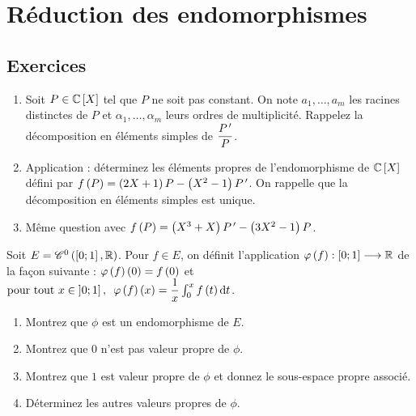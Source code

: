 \chapter{Réduction des endomorphismes}

\minitoc

\section*{Exercices}

\legendeexercices

\begin{exoss}[Exercice 1]
\begin{enumerate}
    \item Soit \(P\in\poly[\C]\) tel que \(P\) ne soit pas constant. On note \(a_1,\dots,a_m\) les racines distinctes de \(P\) et \(\alpha_1,\dots,\alpha_m\) leurs ordres de multiplicité. Rappelez la décomposition en éléments simples de \(\dfrac{P^{\,\prime}}{P}\). \\
    \item Application : déterminez les éléments propres de l'endomorphisme de \(\poly[\C]\) défini par \(f\left(P\right)=\left(2X+1\right)P-\left(X^2-1\right)P^{\,\prime}\). On rappelle que la décomposition en éléments simples est unique. \\
    \item Même question avec \(f\left(P\right)=\left(X^3+X\right)P^{\,\prime}-\left(3X^2-1\right)P\).
\end{enumerate}
\end{exoss}

\begin{corr}
\end{corr}

\begin{exoss}[Exercice 2]
Soit \(E=\mathscr{C}^{0}\left(\left[0;1\right],\mathbb{R}\right)\). Pour \(f\in E\), on définit l'application \(\varphi\left(f\right):\left[0;1\right]\longrightarrow\mathbb{R}\) de la façon suivante : \(\varphi\left(f\right)\left(0\right)=f\left(0\right)\) et \(\quantifs{\tpt x\in\intervei{0}{1}}\phi\paren{f}\paren{x}=\dfrac{1}{x}\int_0^xf\paren{t}\odif{t}\).

\begin{enumerate}
    \item Montrez que \(\phi\) est un endomorphisme de \(E\). \\
    \item Montrez que \(0\) n'est pas valeur propre de \(\phi\). \\
    \item Montrez que \(1\) est valeur propre de \(\phi\) et donnez le sous-espace propre associé. \\
    \item Déterminez les autres valeurs propres de \(\phi\).
\end{enumerate}
\end{exoss}

